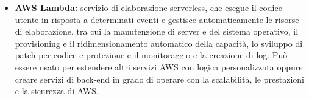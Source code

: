 \begin{itemize}
	\item \textbf{AWS Lambda:} servizio di elaborazione serverless, che esegue il codice utente in risposta a determinati eventi e gestisce automaticamente le risorse di elaborazione, tra cui la manutenzione di server e del sistema operativo, il provisioning e il ridimensionamento automatico della capacità, lo sviluppo di patch per codice e protezione e il monitoraggio e la creazione di log. Può essere usato per estendere altri servizi AWS con logica personalizzata oppure creare servizi di back-end in grado di operare con la scalabilità, le prestazioni e la sicurezza di AWS.
\end{itemize}
